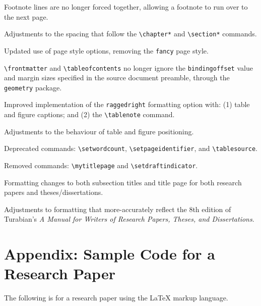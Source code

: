 \documentclass{article}
\begin{document}
Footnote lines are no longer forced together, allowing a footnote to run over to the next page.

Adjustments to the spacing that follow the \texttt{\textbackslash chapter*} and \texttt{\textbackslash section*} commands.

Updated use of page style options, removing the \texttt{fancy} page style.

\texttt{\textbackslash frontmatter} and \texttt{\textbackslash tableofcontents} no longer ignore the \texttt{bindingoffset} value and margin sizes specified in the source document preamble, through the \texttt{geometry} package.

Improved implementation of the \texttt{raggedright} formatting option with: (1) table and figure captions; and (2) the \texttt{\textbackslash tablenote} command.

Adjustments to the behaviour of table and figure positioning.

Deprecated commands: \texttt{\textbackslash setwordcount}, \texttt{\textbackslash setpageidentifier}, and \texttt{\textbackslash tablesource}.

Removed commands: \texttt{\textbackslash mytitlepage} and \texttt{\textbackslash setdraftindicator}.

%
Formatting changes to both subsection titles and title page for both research papers and theses/dissertations.

%
Adjustments to formatting that more-accurately reflect the 8th edition of Turabian's \emph{A Manual for Writers of Research Papers, Theses, and Dissertations}.






\printbibliography



\clearpage

\section*{Appendix: Sample Code for a Research Paper}
\label{sec:sample_code}

The following is for a research paper using the \LaTeX{} markup language.
\vspace{1.3\baselineskip}
\end{document}
